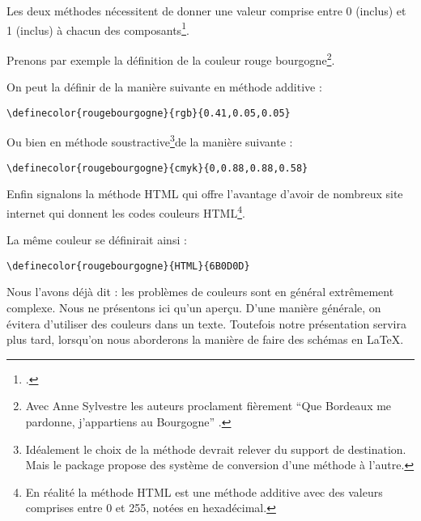 Les deux méthodes nécessitent de donner une valeur comprise entre 0 (inclus) et 1 (inclus) à chacun des composants\footcite[On pourra trouver une série de code couleur sur le site][]{codecouleur}.



Prenons par exemple la définition de la couleur \textcolor{rougebourgogne}{rouge bourgogne}\footnote{Avec Anne Sylvestre les auteurs proclament fièrement \enquote{Que Bordeaux me pardonne, j’appartiens au Bourgogne} \parencite{romaneconti}.}.

On peut la définir de la manière suivante en méthode additive :
\begin{verbatim}
\definecolor{rougebourgogne}{rgb}{0.41,0.05,0.05}
\end{verbatim}

Ou bien en méthode soustractive\footnote{Idéalement le choix de  la méthode devrait relever du support de destination. Mais le package  propose des système de conversion d'une méthode à l'autre.}de la manière suivante :
\begin{verbatim}
\definecolor{rougebourgogne}{cmyk}{0,0.88,0.88,0.58}
\end{verbatim}

Enfin signalons la méthode HTML qui offre l'avantage d'avoir de nombreux site internet qui donnent les codes couleurs HTML\footnote{En réalité la méthode HTML est une méthode additive avec des valeurs comprises entre 0 et 255, notées en hexadécimal.}.

La même couleur se définirait ainsi :

\begin{verbatim}
\definecolor{rougebourgogne}{HTML}{6B0D0D}
\end{verbatim}



\begin{attention}
	Nous l'avons déjà dit : les problèmes de couleurs sont en général extrêmement complexe. Nous ne présentons ici qu'un aperçu. D'une manière générale, on évitera d'utiliser des couleurs dans un texte. Toutefois notre présentation servira plus tard, lorsqu'on nous aborderons la manière de faire des schémas en LaTeX.
	
\end{attention}



